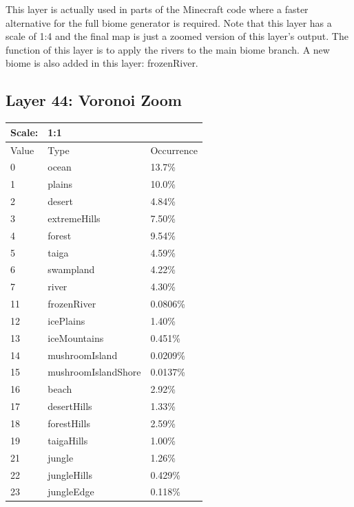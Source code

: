 \documentclass{article}
\begin{document}
	\medskip\noindent
	This layer is actually used in parts of the Minecraft code where a faster alternative for the full biome generator is required. Note that this layer has a scale of 1:4 and the final map is just a zoomed version of this layer's output. The function of this layer is to apply the rivers to the main biome branch. A new biome is also added in this layer: frozenRiver.


	\subsection{Layer 44: Voronoi Zoom}
	\begin{tabular}{|l|l|l|}\hline
		Scale: & \multicolumn{2}{|l|}{1:1} \\\hline\hline
		Value  & Type                & Occurrence \\\hline
		0      & ocean               & 13.7\%\\\hline
		1      & plains              & 10.0\%\\\hline
		2      & desert              & 4.84\%\\\hline
		3      & extremeHills        & 7.50\%\\\hline
		4      & forest              & 9.54\%\\\hline
		5      & taiga               & 4.59\%\\\hline
		6      & swampland           & 4.22\%\\\hline
		7      & river               & 4.30\%\\\hline
		11     & frozenRiver         & 0.0806\%\\\hline
		12     & icePlains           & 1.40\%\\\hline
		13     & iceMountains        & 0.451\%\\\hline
		14     & mushroomIsland      & 0.0209\%\\\hline
		15     & mushroomIslandShore & 0.0137\%\\\hline
		16     & beach               & 2.92\%\\\hline
		17     & desertHills         & 1.33\%\\\hline
		18     & forestHills         & 2.59\%\\\hline
		19     & taigaHills          & 1.00\%\\\hline
		21     & jungle              & 1.26\%\\\hline
		22     & jungleHills         & 0.429\%\\\hline
		23     & jungleEdge          & 0.118\%\\\hline

\end{tabular}
\end{document}
